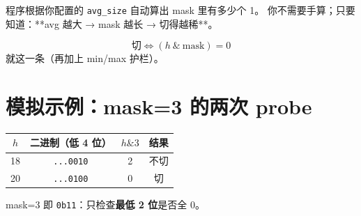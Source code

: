 程序根据你配置的 \texttt{avg\_size} 自动算出 mask 里有多少个 1。  
你不需要手算；只要知道：**avg 越大 → mask 越长 → 切得越稀**。

\begin{stepbox}[Step 5 — 第一代切点 = 一个条件]
\[
\text{切} \Leftrightarrow (h \ \& \ \text{mask}) = 0
\]
就这一条（再加上 min/max 护栏）。
\end{stepbox}

\section{模拟示例：mask=3 的两次 probe}

\begin{simbox}[$h=18$ vs $h=20$（Chunk 1 真实数值）]
\begin{tabular}{@{}cccc@{}}
\toprule
$h$ & 二进制（低 4 位） & $h \& 3$ & 结果 \\
\midrule
18 & \texttt{...0010} & 2 & 不切 \\
20 & \texttt{...0100} & 0 & 切 \\
\bottomrule
\end{tabular}

\vspace{0.4em}
mask=3 即 \texttt{0b11}：只检查\textbf{最低 2 位}是否全 0。
\end{simbox}
